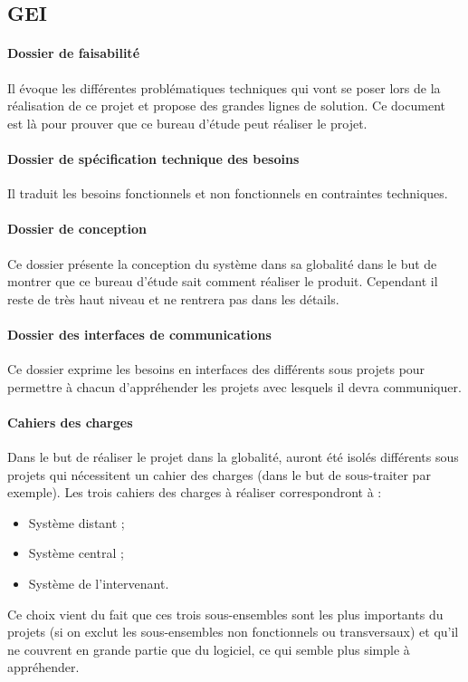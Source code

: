 \documentclass[a4paper, 11pt, draft]{report}
\begin{document}
    \subsection{GEI}
        \paragraph{Dossier de faisabilité} Il évoque les différentes problématiques techniques qui vont se poser lors de la réalisation de ce projet et propose des grandes lignes de solution. Ce document est là pour prouver que ce bureau d'étude peut réaliser le projet.
        \paragraph{Dossier de spécification technique des besoins} Il traduit les besoins fonctionnels et non fonctionnels en contraintes techniques.
        \paragraph{Dossier de conception} Ce dossier présente la conception du système dans sa globalité dans le but de montrer que ce bureau d'étude sait comment réaliser le produit. Cependant il reste de très haut niveau et ne rentrera pas dans les détails.
        \paragraph{Dossier des interfaces de communications} Ce dossier exprime les besoins en interfaces des différents sous projets pour permettre à chacun d'appréhender les projets avec lesquels il devra communiquer.
        \paragraph{Cahiers des charges} Dans le but de réaliser le projet dans la globalité, auront été isolés différents sous projets qui nécessitent un cahier des charges (dans le but de sous-traiter par exemple). 
        Les trois cahiers des charges à réaliser correspondront à :
        \begin{itemize}
            \item Système distant ;
            \item Système central ;
            \item Système de l'intervenant.
        \end{itemize}

        Ce choix vient du fait que ces trois sous-ensembles sont les plus importants du projets (si on exclut les sous-ensembles non fonctionnels ou transversaux) et qu'il ne couvrent en grande partie que du logiciel, ce qui semble plus simple à appréhender.
\end{document}
